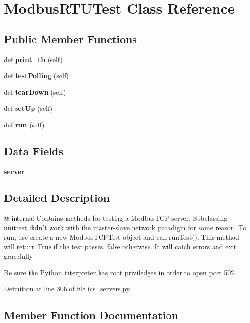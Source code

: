 \section{Modbus\+R\+T\+U\+Test Class Reference}
\label{classprotolibs_1_1ics__servers_1_1_modbus_r_t_u_test}
\subsection*{Public Member Functions}
\begin{DoxyCompactItemize}
\item 
def {\bf print\+\_\+tb} (self)
\item 
def {\bf test\+Polling} (self)
\item 
def {\bf tear\+Down} (self)
\item 
def {\bf set\+Up} (self)
\item 
def {\bf run} (self)
\end{DoxyCompactItemize}
\subsection*{Data Fields}
\begin{DoxyCompactItemize}
\item 
{\bf server}
\end{DoxyCompactItemize}


\subsection{Detailed Description}
\begin{DoxyVerb}@ internal
   Contains methods for testing a ModbusTCP server. Subclassing unittest 
        didn't work  with the master-slave network paradigm for some reason.
    To run, use create a new ModbusTCPTest object and call runTest(). This
    method will return True if the test passes, false otherwise. It will
    catch errors and exit gracefully. 
    
    Be sure the Python interpreter has root priviledges in order to open
    port 502.
\end{DoxyVerb}
 

Definition at line 306 of file ics\+\_\+servers.\+py.



\subsection{Member Function Documentation}
